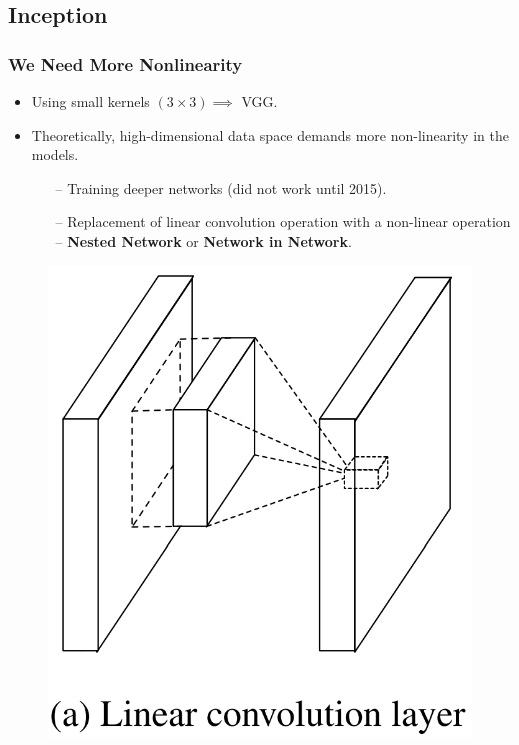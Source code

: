 \documentclass[9pt]{beamer}
\begin{document}
\subsection{Inception}
\begin{frame}
	\frametitle{We Need More Nonlinearity}
		\begin{itemize}
			\item Using small kernels $(3\times 3) \implies$ VGG.
			\item Theoretically, high-dimensional data space demands more non-linearity in the models.
				\begin{itemize}
					\item[--] Training deeper networks (did not work until 2015).
					\item[--] Replacement of linear convolution operation with a non-linear operation -- \textbf{Nested Network} or \textbf{Network in Network}.
				\end{itemize}				
		\end{itemize}
		\pause	
	\begin{figure}
		\includegraphics[scale=0.15]{./figures/edit/nin_01.png} \hspace{2em}

\end{figure}
\end{frame}
\end{document}
